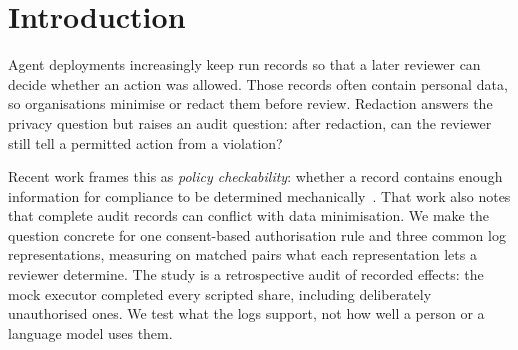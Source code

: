 \documentclass[11pt]{article}
\begin{document}
\section{Introduction}

Agent deployments increasingly keep run records so that a later reviewer can decide whether an action was allowed. Those records often contain personal data, so organisations minimise or redact them before review. Redaction answers the privacy question but raises an audit question: after redaction, can the reviewer still tell a permitted action from a violation?

Recent work frames this as \emph{policy checkability}: whether a record contains enough information for compliance to be determined mechanically~\cite{nian2026auditable}. That work also notes that complete audit records can conflict with data minimisation. We make the question concrete for one consent-based authorisation rule and three common log representations, measuring on matched pairs what each representation lets a reviewer determine. The study is a retrospective audit of recorded effects: the mock executor completed every scripted share, including deliberately unauthorised ones. We test what the logs support, not how well a person or a language model uses them.
\end{document}
